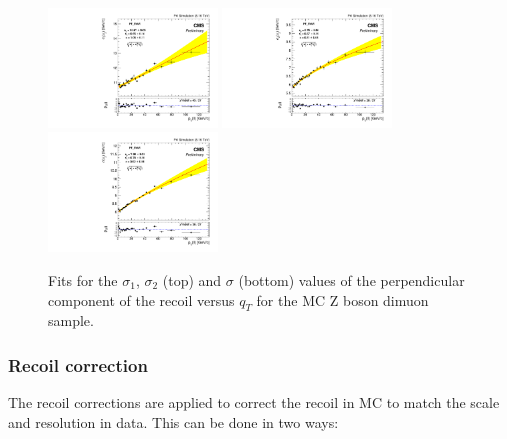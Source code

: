 \begin{figure}[h!]
\begin{center}
\includegraphics[width=0.4\textwidth]{Figures/WBoson/Analysis/Correction/Recoil/RecoilFitsqT/MC/fitPFu2sigma1.pdf}
\includegraphics[width=0.4\textwidth]{Figures/WBoson/Analysis/Correction/Recoil/RecoilFitsqT/MC/fitPFu2sigma2.pdf} \\
\includegraphics[width=0.4\textwidth]{Figures/WBoson/Analysis/Correction/Recoil/RecoilFitsqT/MC/fitPFu2sigma.pdf}
\caption{Fits for the $\sigma_{1}$,  $\sigma_{2}$ (top) and $\sigma$ (bottom) values of the perpendicular component of the recoil versus $q_{T}$ for the MC Z boson dimuon sample.}
\label{fig:figU2RecoilResolutionFit_MC}
\end{center}
\end{figure}

\clearpage

\subsubsection{Recoil correction}\label{sec:WBoson_Analysis_RecoilCorr}

The recoil corrections are applied to correct the recoil in MC to match the scale and resolution in data. This can be done in two ways:

